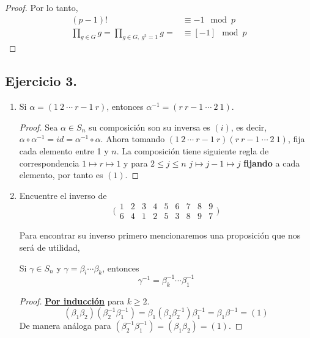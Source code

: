 \documentclass[11pt,letterpaper]{article}
\begin{document}
\begin{enumerate}[label=\alph*)]
\begin{proof}
        Por lo tanto,
        \begin{align*}
            (p-1)! &\equiv -1 \mod p\\
            \prod_{g \in G} g = \prod_{g \in G,\ g^2 = 1} g = &\equiv [-1] \mod p
        \end{align*}

    \end{proof}
\end{enumerate}

\subsection*{Ejercicio 3.}
\begin{enumerate}[label=\alph*)]
    \item Si $\alpha = (1 \ 2 \ \cdots \ r-1 \ r)$, entonces $\alpha^{-1} = (r \ r-1 \ \cdots \ 2 \ 1)$.
    \begin{proof}
        Sea $\alpha \in S_n$ su composición son su inversa es $(i)$, es decir,\\
        $\alpha \circ \alpha^{-1} = id = \alpha^{-1} \circ \alpha$.
        Ahora tomando $(1 \ 2 \ \cdots \ r-1 \ r) (r \ r-1 \ \cdots \ 2 \ 1)$, fija cada elemento entre 1 y $n$.
        La composición tiene siguiente regla de correspondencia $1 \mapsto r \mapsto 1$ y para $2 \leq j \leq n$
        $j \mapsto j-1 \mapsto j$ \textbf{fijando} a cada elemento, por tanto es $(1)$.
    \end{proof}

    \item Encuentre el inverso de
    \[
        \bigl(\begin{smallmatrix}
        1 & 2 & 3 & 4 & 5 & 6 & 7 & 8 & 9\\
        6 & 4 & 1 & 2 & 5 & 3 & 8 & 9 & 7
        \end{smallmatrix}\bigr)
    \]

    Para encontrar su inverso primero mencionaremos una proposición que nos será de utilidad,
    \begin{prop}
        Si $\gamma \in S_n$ y $\gamma = \beta_i \cdots \beta_k$, entonces
        $$ \gamma^{-1} = \beta_k^{-1} \cdots \beta_1^{-1} $$
        \begin{proof} \textbf{\underline{Por inducción} } para $k \geq 2$.
            \[
                (\beta_1 \beta_2)(\beta_2^{-1} \beta_1^{-1}) =
                    \beta_1(\beta_2\beta_2^{-1})\beta_1^{-1} =
                    \beta_1 \beta^{-1} = (1)
            \]
            De manera análoga para $(\beta_2^{-1} \beta_1^{-1}) = (\beta_1 \beta_2) = (1)$.
            

\end{proof}
\end{prop}
\end{enumerate}
\end{document}
